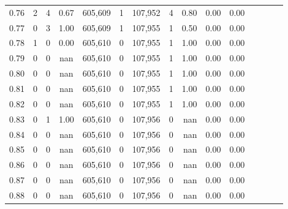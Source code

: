 \begin{tabular}{rrrcrrrrrrrrrrr}
0.76 &       2 &      4 &                                       0.67 &  605,609 &        1 &  107,952 &        4 &  0.80 &  0.00 &                         0.00 \\
0.77 &       0 &      3 &                                       1.00 &  605,609 &        1 &  107,955 &        1 &  0.50 &  0.00 &                         0.00 \\
0.78 &       1 &      0 &                                       0.00 &  605,610 &        0 &  107,955 &        1 &  1.00 &  0.00 &                         0.00 \\
0.79 &       0 &      0 &                                        nan &  605,610 &        0 &  107,955 &        1 &  1.00 &  0.00 &                         0.00 \\
0.80 &       0 &      0 &                                        nan &  605,610 &        0 &  107,955 &        1 &  1.00 &  0.00 &                         0.00 \\
0.81 &       0 &      0 &                                        nan &  605,610 &        0 &  107,955 &        1 &  1.00 &  0.00 &                         0.00 \\
0.82 &       0 &      0 &                                        nan &  605,610 &        0 &  107,955 &        1 &  1.00 &  0.00 &                         0.00 \\
0.83 &       0 &      1 &                                       1.00 &  605,610 &        0 &  107,956 &        0 &   nan &  0.00 &                         0.00 \\
0.84 &       0 &      0 &                                        nan &  605,610 &        0 &  107,956 &        0 &   nan &  0.00 &                         0.00 \\
0.85 &       0 &      0 &                                        nan &  605,610 &        0 &  107,956 &        0 &   nan &  0.00 &                         0.00 \\
0.86 &       0 &      0 &                                        nan &  605,610 &        0 &  107,956 &        0 &   nan &  0.00 &                         0.00 \\
0.87 &       0 &      0 &                                        nan &  605,610 &        0 &  107,956 &        0 &   nan &  0.00 &                         0.00 \\
0.88 &       0 &      0 &                                        nan &  605,610 &        0 &  107,956 &        0 &   nan &  0.00 &                         0.00 \\

\end{tabular}
